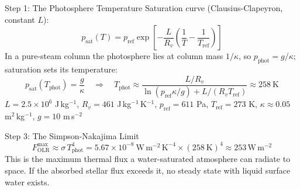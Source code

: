 \documentclass[aspectratio=169, 11pt]{beamer}
\begin{document}
\begin{frame}{Step 1: The Photosphere Temperature}
  Saturation curve (Clausius-Clapeyron, constant $L$):
  $$p_{\mathrm{sat}}(T) = p_{\mathrm{ref}} \exp\!\left[-\frac{L}{R_v}\left(\frac{1}{T} - \frac{1}{T_{\mathrm{ref}}}\right)\right]$$
  In a pure-steam column the photosphere lies at column mass $1/\kappa$, so $p_{\mathrm{phot}} = g/\kappa$; saturation sets its temperature:
  $$p_{\mathrm{sat}}(T_{\mathrm{phot}}) = \frac{g}{\kappa} \quad\Rightarrow\quad T_{\mathrm{phot}} \approx \frac{L/R_v}{\ln(p_{\mathrm{ref}}\kappa/g) + L/(R_v T_{\mathrm{ref}})} \approx 258\ \mathrm{K}$$
  {\small $L = 2.5\times10^{6}$ J\,kg$^{-1}$, $R_v = 461$ J\,kg$^{-1}$\,K$^{-1}$, $p_{\mathrm{ref}} = 611$ Pa, $T_{\mathrm{ref}} = 273$ K, $\kappa \approx 0.05$ m$^2$\,kg$^{-1}$, $g = 10$ m\,s$^{-2}$}
  \vskip4pt
\end{frame}

\begin{frame}
\end{frame}

\begin{frame}{Step 3: The Simpson-Nakajima Limit}
  $$F_{\mathrm{OLR}}^{\max} \approx \sigma\, T_{\mathrm{phot}}^4 = 5.67\times 10^{-8}\ \mathrm{W\,m^{-2}\,K^{-4}} \times (258\ \mathrm{K})^4 \approx 253\, \mathrm{W\,m^{-2}}$$
  \vskip4pt
  \vskip4pt
  This is the maximum thermal flux a water-saturated atmosphere can radiate to space. If the absorbed stellar flux exceeds it, no steady state with liquid surface water exists.
\end{frame}
\end{document}

